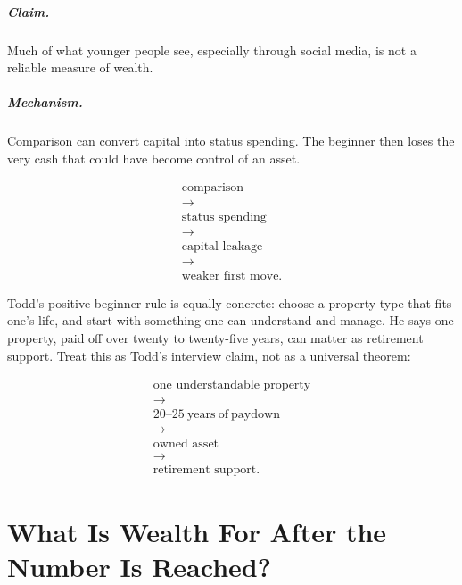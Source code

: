 \documentclass[11pt,oneside]{book}
\begin{document}
\paragraph{Claim.}
Much of what younger people see, especially through social media, is not a reliable measure of wealth.

\paragraph{Mechanism.}
Comparison can convert capital into status spending. The beginner then loses the very cash that could have become control of an asset.

\begin{equation}
\begin{gathered}
\text{comparison}\\
\rightarrow\\
\text{status spending}\\
\rightarrow\\
\text{capital leakage}\\
\rightarrow\\
\text{weaker first move}.
\end{gathered}
\end{equation}

Todd's positive beginner rule is equally concrete: choose a property type that fits one's life, and start with something one can understand and manage. He says one property, paid off over twenty to twenty-five years, can matter as retirement support. Treat this as Todd's interview claim, not as a universal theorem:

\begin{equation}
\begin{gathered}
\text{one understandable property}\\
\rightarrow\\
20\text{--}25\ \mathrm{years\ of\ paydown}\\
\rightarrow\\
\text{owned asset}\\
\rightarrow\\
\text{retirement support}.
\end{gathered}
\end{equation}

\chapter{What Is Wealth For After the Number Is Reached?}
\end{document}
